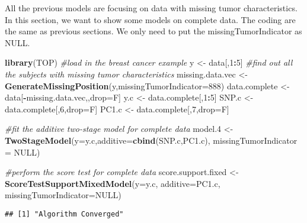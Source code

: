 \documentclass[11pt,]{article}
\newenvironment{Shaded}{\begin{snugshade}}{\end{snugshade}}
\newcommand{\KeywordTok}[1]{\textcolor[rgb]{0.13,0.29,0.53}{\textbf{#1}}}
\newcommand{\DataTypeTok}[1]{\textcolor[rgb]{0.13,0.29,0.53}{#1}}
\newcommand{\DecValTok}[1]{\textcolor[rgb]{0.00,0.00,0.81}{#1}}
\newcommand{\StringTok}[1]{\textcolor[rgb]{0.31,0.60,0.02}{#1}}
\newcommand{\CommentTok}[1]{\textcolor[rgb]{0.56,0.35,0.01}{\textit{#1}}}
\newcommand{\OtherTok}[1]{\textcolor[rgb]{0.56,0.35,0.01}{#1}}
\newcommand{\OperatorTok}[1]{\textcolor[rgb]{0.81,0.36,0.00}{\textbf{#1}}}
\newcommand{\NormalTok}[1]{#1}
\begin{document}
All the previous models are focusing on data with missing tumor
characteristics. In this section, we want to show some models on
complete data. The coding are the same as previous sections. We only
need to put the missingTumorIndicator as NULL.

\begin{Shaded}
\begin{Highlighting}[]
\KeywordTok{library}\NormalTok{(TOP)}
\CommentTok{#load in the breast cancer example}
\NormalTok{y <-}\StringTok{ }\NormalTok{data[,}\DecValTok{1}\OperatorTok{:}\DecValTok{5}\NormalTok{]}
\CommentTok{#find out all the subjects with missing tumor characteristics}
\NormalTok{missing.data.vec <-}\StringTok{ }\KeywordTok{GenerateMissingPosition}\NormalTok{(y,}\DataTypeTok{missingTumorIndicator=}\DecValTok{888}\NormalTok{)}
\NormalTok{data.complete <-}\StringTok{ }\NormalTok{data[}\OperatorTok{-}\NormalTok{missing.data.vec,,drop=F]}
\NormalTok{y.c <-}\StringTok{ }\NormalTok{data.complete[,}\DecValTok{1}\OperatorTok{:}\DecValTok{5}\NormalTok{]}
\NormalTok{SNP.c <-}\StringTok{ }\NormalTok{data.complete[,}\DecValTok{6}\NormalTok{,drop=F]}
\NormalTok{PC1.c <-}\StringTok{ }\NormalTok{data.complete[,}\DecValTok{7}\NormalTok{,drop=F]}

\CommentTok{#fit the additive two-stage model for complete data}
\NormalTok{model.}\DecValTok{4}\NormalTok{ <-}\StringTok{ }\KeywordTok{TwoStageModel}\NormalTok{(}\DataTypeTok{y=}\NormalTok{y.c,}\DataTypeTok{additive=}\KeywordTok{cbind}\NormalTok{(SNP.c,PC1.c),}
                         \DataTypeTok{missingTumorIndicator =} \OtherTok{NULL}\NormalTok{)}


\CommentTok{#perform the score test for complete data}
\NormalTok{score.support.fixed <-}\StringTok{ }\KeywordTok{ScoreTestSupportMixedModel}\NormalTok{(}\DataTypeTok{y=}\NormalTok{y.c,}
                                                  \DataTypeTok{additive=}\NormalTok{PC1.c,}
                                                  \DataTypeTok{missingTumorIndicator=}\OtherTok{NULL}\NormalTok{)}
\end{Highlighting}
\end{Shaded}

\begin{verbatim}
## [1] "Algorithm Converged"
\end{verbatim}
\end{document}
